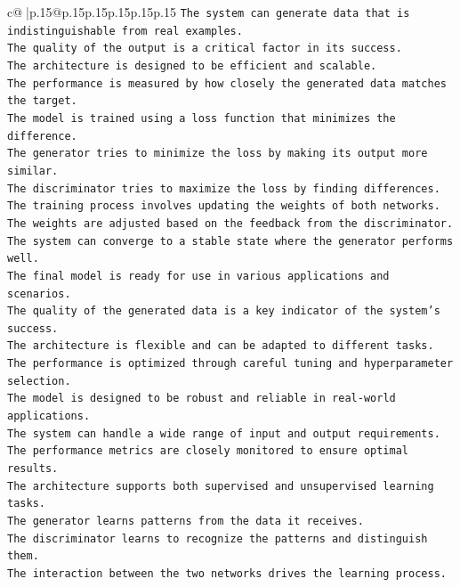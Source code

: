 \documentclass{article}
\begin{document}
{\begin{supertabular}{c@{$\;$}|p{.15\linewidth}@{}p{.15\linewidth}p{.15\linewidth}p{.15\linewidth}p{.15\linewidth}p{.15\linewidth}}
{{{\texttt{The system can generate data that is indistinguishable from real examples.  } \\
\texttt{The quality of the output is a critical factor in its success.  } \\
\texttt{The architecture is designed to be efficient and scalable.  } \\
\texttt{The performance is measured by how closely the generated data matches the target.  } \\
\texttt{The model is trained using a loss function that minimizes the difference.  } \\
\texttt{The generator tries to minimize the loss by making its output more similar.  } \\
\texttt{The discriminator tries to maximize the loss by finding differences.  } \\
\texttt{The training process involves updating the weights of both networks.  } \\
\texttt{The weights are adjusted based on the feedback from the discriminator.  } \\
\texttt{The system can converge to a stable state where the generator performs well.  } \\
\texttt{The final model is ready for use in various applications and scenarios.  } \\
\texttt{The quality of the generated data is a key indicator of the system's success.  } \\
\texttt{The architecture is flexible and can be adapted to different tasks.  } \\
\texttt{The performance is optimized through careful tuning and hyperparameter selection.  } \\
\texttt{The model is designed to be robust and reliable in real{-}world applications.  } \\
\texttt{The system can handle a wide range of input and output requirements.  } \\
\texttt{The performance metrics are closely monitored to ensure optimal results.  } \\
\texttt{The architecture supports both supervised and unsupervised learning tasks.  } \\
\texttt{The generator learns patterns from the data it receives.  } \\
\texttt{The discriminator learns to recognize the patterns and distinguish them.  } \\
\texttt{The interaction between the two networks drives the learning process.  } \\
}}}
\end{supertabular}}
\end{document}
